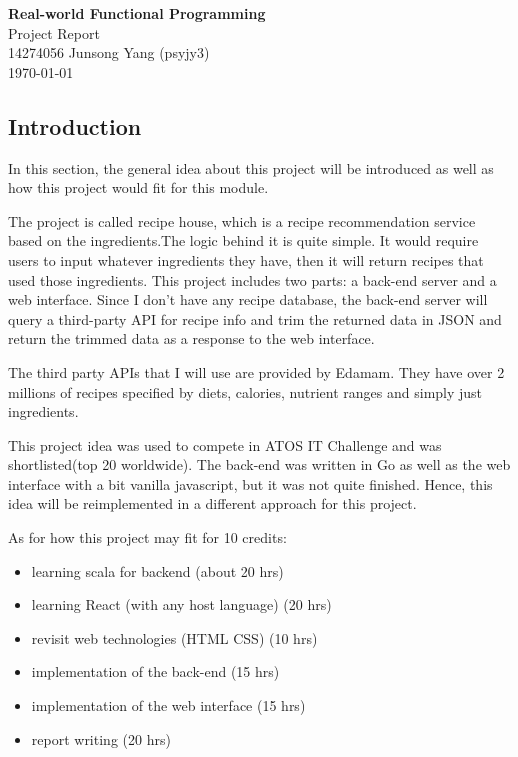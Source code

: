 \documentclass{article}
\begin{document}
\begin{center}
  \LARGE{\textbf{Real-world Functional Programming}} \\
  \Large{Project Report} \\
  \normalsize{14274056 Junsong Yang (psyjy3)} \\
  \today
\end{center}


\begin{normalsize}
  \section{Introduction}
  In this section, the general idea about this project will be introduced as
  well as how this project would fit for this module.

  The project is called recipe house, which is a recipe recommendation service
  based on the ingredients.The logic behind it is quite simple. It would require
  users to input whatever ingredients they have, then it will return recipes
  that used those ingredients. This project includes two parts: a back-end
  server and a web interface. Since I don't have any recipe database, the
  back-end server will query a third-party API for recipe info and trim the
  returned data in JSON and return the trimmed data as a response to the web
  interface.

  The third party APIs that I will use are provided by Edamam. They have over 2
  millions of recipes specified by diets, calories, nutrient ranges and simply
  just ingredients.

  This project idea was used to compete in ATOS IT Challenge and was
  shortlisted(top 20 worldwide). The back-end was written in Go as well as the
  web interface with a bit vanilla javascript, but it was not quite finished.
  Hence, this idea will be reimplemented in a different approach for this
  project.

  As for how this project may fit for 10 credits:
  \begin{itemize}
  \item[]{learning scala for backend (about 20 hrs)}
  \item[]{learning React (with any host language) (20 hrs)}
  \item[]{revisit web technologies (HTML CSS) (10 hrs)}
  \item[]{implementation of the back-end (15 hrs)}
  \item[]{implementation of the web interface (15 hrs)}
  \item[]{report writing (20 hrs)}  
  \end{itemize}


\end{normalsize}
\end{document}
